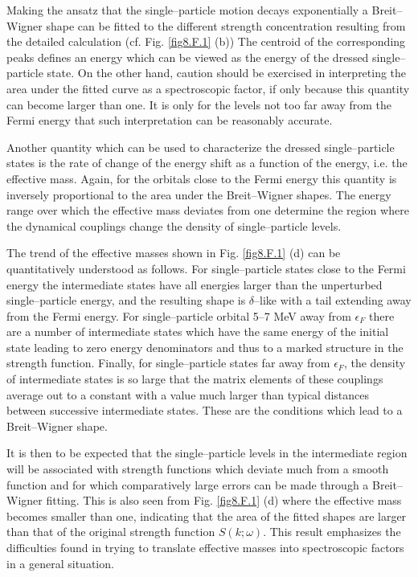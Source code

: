 \begin{subappendices}
Making the ansatz that the single--particle motion decays exponentially a Breit--Wigner shape can be fitted to the different strength concentration resulting from the detailed calculation (cf. Fig. \ref{fig8.F.1} (b)) The centroid of the corresponding peaks defines an energy which can be viewed as the energy of the dressed single--particle state. On the other hand, caution should be exercised in interpreting the area under the fitted curve as a spectroscopic factor, if only because this quantity can become larger than one. It is only for the levels not too far away from the Fermi energy that such interpretation can   be reasonably accurate.


Another quantity which can be used to characterize the dressed single--particle states is the rate of change of the energy shift as a function of the energy, i.e. the effective mass. Again, for the orbitals close to the Fermi energy this quantity is inversely proportional to the area under the Breit--Wigner shapes. The energy range over which the effective mass deviates from one determine the region where the dynamical couplings change the density of single--particle levels.



The trend of the effective masses shown in Fig. \ref{fig8.F.1} (d) can be quantitatively understood as follows. For single--particle states close to the Fermi energy the intermediate states have all energies larger than the unperturbed single--particle energy, and the resulting shape is $\delta$--like with a tail extending away from the Fermi energy. For single--particle orbital 5--7 MeV away from $\epsilon_F$ there are a number of intermediate states which have the same energy of the initial state leading to zero energy denominators and thus to a marked structure in the strength function. Finally, for single--particle states far away from $\epsilon_F$, the density of intermediate states is so large that the matrix elements of these couplings average out to a constant with a value much larger than typical distances between successive intermediate states. These are the conditions which lead to a Breit--Wigner shape.  


It is then to be expected that the single--particle levels in the intermediate region will be associated with strength functions which deviate much from a smooth function and for which comparatively large errors can be made through a Breit--Wigner fitting. This is also seen from Fig. \ref{fig8.F.1} (d) where the effective mass becomes smaller than one, indicating that the area of the fitted shapes are larger than that of the original strength function $S(k;\omega)$. This result emphasizes the difficulties found in trying to translate effective masses into spectroscopic factors in a general situation.



\end{subappendices}
